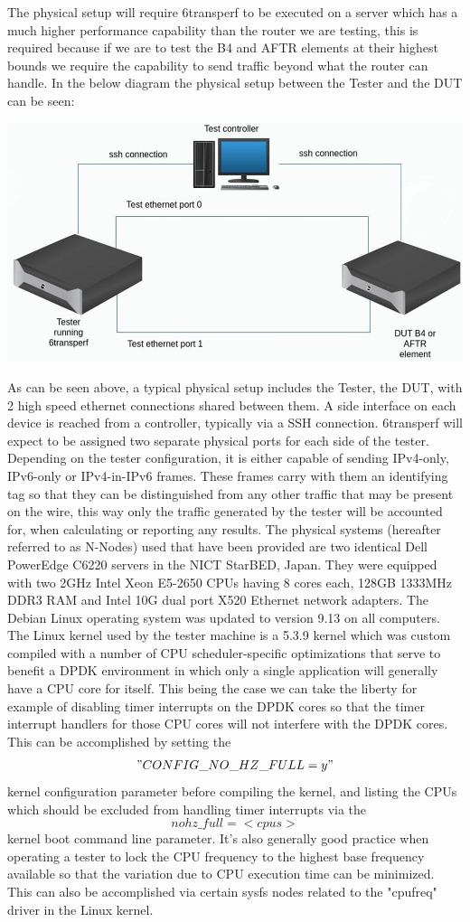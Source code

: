 \documentclass[a4paper,12p]{article}
\begin{document}
The physical setup will require 6transperf to be executed on a server which has a much higher performance capability than the router we are testing, this is required because if we are to test the B4 and AFTR elements at their highest bounds we require the capability to send traffic beyond what the router can handle. In the below diagram the physical setup between the Tester and the DUT can be seen:

\includegraphics[width=\textwidth]{testsetup}

As can be seen above, a typical physical setup includes the Tester, the DUT, with 2 high speed ethernet connections shared between them. A side interface on each device is reached from a controller, typically via a SSH connection.
6transperf will expect to be assigned two separate physical ports for each side of the tester. Depending on the tester configuration, it is either capable of sending IPv4-only, IPv6-only or IPv4-in-IPv6 frames. These frames carry with them an identifying tag so that they can be distinguished from any other traffic that may be present on the wire, this way only the traffic generated by the tester will be accounted for, when calculating or reporting any results.
The physical systems (hereafter referred to as N-Nodes) used that have been provided are two identical Dell PowerEdge C6220 servers in the NICT StarBED, Japan. They were equipped with two 2GHz Intel Xeon E5-2650 CPUs having 8 cores each, 128GB 1333MHz DDR3 RAM and Intel 10G dual port X520 Ethernet network adapters. The Debian Linux operating system was updated to version 9.13 on all computers. The Linux kernel used by the tester machine is a 5.3.9 kernel which was custom compiled with a number of CPU scheduler-specific optimizations that serve to benefit a DPDK environment in which only a single application will generally have a CPU core for itself. This being the case we can take the liberty for example of disabling timer interrupts on the DPDK cores so that the timer interrupt handlers for those CPU cores will not interfere with the DPDK cores. This can be accomplished by setting the $$"CONFIG\_NO\_HZ\_FULL=y"$$ kernel configuration parameter before compiling the kernel, and listing the CPUs which should be excluded from handling timer interrupts via the $$nohz\_full=<cpus>$$ kernel boot command line parameter. It’s also generally good practice when operating a tester to lock the CPU frequency to the highest base frequency available so that the variation due to CPU execution time can be minimized. This can also be accomplished via certain sysfs nodes related to the "cpufreq" driver in the Linux kernel.
\end{document}
